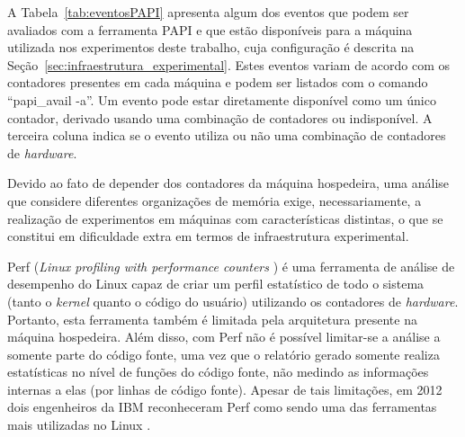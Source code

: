 A Tabela~\ref{tab:eventosPAPI} apresenta algum dos eventos que podem ser avaliados com a ferramenta PAPI e que estão disponíveis para a máquina utilizada nos experimentos deste trabalho, cuja configuração é descrita na Seção~\ref{sec:infraestrutura_experimental}.
Estes eventos variam de acordo com os contadores presentes em cada máquina e podem ser listados com o comando ``papi\_avail -a''.
Um evento pode estar diretamente disponível como um único contador, derivado usando uma combinação de contadores ou indisponível.
A terceira coluna indica se o evento utiliza ou não uma combinação de contadores de \textit{hardware}.

Devido ao fato de depender dos contadores da máquina hospedeira, uma análise que considere diferentes organizações de memória exige, necessariamente, a realização de experimentos em máquinas com características distintas, o que se constitui em dificuldade extra em termos de infraestrutura experimental.



Perf (\textit{Linux profiling with performance counters} \cite{perf}) é uma ferramenta de análise de desempenho do Linux capaz de criar um perfil estatístico de todo o sistema (tanto o \textit{kernel} quanto o código do usuário) utilizando os contadores de \textit{hardware}. Portanto, esta ferramenta também é limitada pela arquitetura presente na máquina hospedeira.
Além disso, com Perf não é possível limitar-se a análise a somente parte do código fonte, uma vez que 
o relatório gerado somente realiza estatísticas no nível de funções do código fonte, não medindo as informações internas a elas (por linhas de código fonte).
Apesar de tais limitações, em 2012 dois engenheiros da IBM reconheceram Perf como sendo uma das ferramentas mais utilizadas no Linux \cite{perfIBM}.




